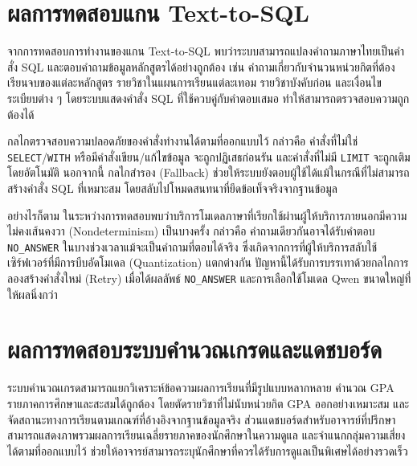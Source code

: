 \section{ผลการทดสอบแกน Text-to-SQL}

จากการทดสอบการทำงานของแกน Text-to-SQL พบว่าระบบสามารถแปลงคำถามภาษาไทยเป็นคำสั่ง SQL และตอบคำถามข้อมูลหลักสูตรได้อย่างถูกต้อง เช่น คำถามเกี่ยวกับจำนวนหน่วยกิตที่ต้องเรียนจบของแต่ละหลักสูตร รายวิชาในแผนการเรียนแต่ละเทอม รายวิชาบังคับก่อน และเงื่อนไขระเบียบต่าง ๆ โดยระบบแสดงคำสั่ง SQL ที่ใช้ควบคู่กับคำตอบเสมอ ทำให้สามารถตรวจสอบความถูกต้องได้

กลไกตรวจสอบความปลอดภัยของคำสั่งทำงานได้ตามที่ออกแบบไว้ กล่าวคือ คำสั่งที่ไม่ใช่ \texttt{SELECT}/\texttt{WITH} หรือมีคำสั่งเขียน/แก้ไขข้อมูล จะถูกปฏิเสธก่อนรัน และคำสั่งที่ไม่มี \texttt{LIMIT} จะถูกเติมโดยอัตโนมัติ นอกจากนี้ กลไกสำรอง (Fallback) ช่วยให้ระบบยังตอบผู้ใช้ได้แม้ในกรณีที่ไม่สามารถสร้างคำสั่ง SQL ที่เหมาะสม โดยสลับไปโหมดสนทนาที่ยึดข้อเท็จจริงจากฐานข้อมูล

อย่างไรก็ตาม ในระหว่างการทดสอบพบว่าบริการโมเดลภาษาที่เรียกใช้ผ่านผู้ให้บริการภายนอกมีความไม่คงเส้นคงวา (Nondeterminism) เป็นบางครั้ง กล่าวคือ คำถามเดียวกันอาจได้รับคำตอบ \texttt{NO\_ANSWER} ในบางช่วงเวลาแม้จะเป็นคำถามที่ตอบได้จริง ซึ่งเกิดจากการที่ผู้ให้บริการสลับใช้เซิร์ฟเวอร์ที่มีการบีบอัดโมเดล (Quantization) แตกต่างกัน ปัญหานี้ได้รับการบรรเทาด้วยกลไกการลองสร้างคำสั่งใหม่ (Retry) เมื่อได้ผลลัพธ์ \texttt{NO\_ANSWER} และการเลือกใช้โมเดล Qwen ขนาดใหญ่ที่ให้ผลนิ่งกว่า

\section{ผลการทดสอบระบบคำนวณเกรดและแดชบอร์ด}

ระบบคำนวณเกรดสามารถแยกวิเคราะห์ข้อความผลการเรียนที่มีรูปแบบหลากหลาย คำนวณ GPA รายภาคการศึกษาและสะสมได้ถูกต้อง โดยตัดรายวิชาที่ไม่นับหน่วยกิต GPA ออกอย่างเหมาะสม และจัดสถานะทางการเรียนตามเกณฑ์ที่อ้างอิงจากฐานข้อมูลจริง ส่วนแดชบอร์ดสำหรับอาจารย์ที่ปรึกษาสามารถแสดงภาพรวมผลการเรียนเฉลี่ยรายภาคของนักศึกษาในความดูแล และจำแนกกลุ่มความเสี่ยงได้ตามที่ออกแบบไว้ ช่วยให้อาจารย์สามารถระบุนักศึกษาที่ควรได้รับการดูแลเป็นพิเศษได้อย่างรวดเร็ว
